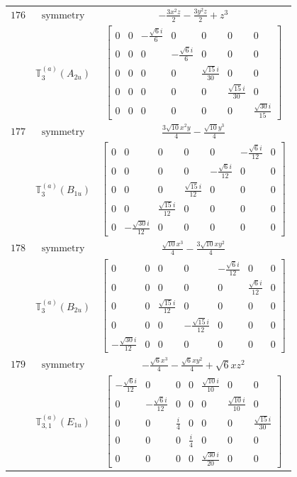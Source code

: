\documentclass[fleqn,8pt,landscape]{jsarticle}
\begin{document}
\begin{longtable}{ccc}
$ 176 $ & $ \text{symmetry} $ & $ - \frac{3 x^{2} z}{2} - \frac{3 y^{2} z}{2} + z^{3} $ \\
$  $ & $ \mathbb{T}_{3}^{(a)}(A_{2u}) $ & $ \begin{bmatrix} 0 & 0 & - \frac{\sqrt{6} i}{6} & 0 & 0 & 0 & 0 \\ 0 & 0 & 0 & - \frac{\sqrt{6} i}{6} & 0 & 0 & 0 \\ 0 & 0 & 0 & 0 & \frac{\sqrt{15} i}{30} & 0 & 0 \\ 0 & 0 & 0 & 0 & 0 & \frac{\sqrt{15} i}{30} & 0 \\ 0 & 0 & 0 & 0 & 0 & 0 & \frac{\sqrt{30} i}{15} \end{bmatrix} $ \\ \hline
$ 177 $ & $ \text{symmetry} $ & $ \frac{3 \sqrt{10} x^{2} y}{4} - \frac{\sqrt{10} y^{3}}{4} $ \\
$  $ & $ \mathbb{T}_{3}^{(a)}(B_{1u}) $ & $ \begin{bmatrix} 0 & 0 & 0 & 0 & 0 & - \frac{\sqrt{6} i}{12} & 0 \\ 0 & 0 & 0 & 0 & - \frac{\sqrt{6} i}{12} & 0 & 0 \\ 0 & 0 & 0 & \frac{\sqrt{15} i}{12} & 0 & 0 & 0 \\ 0 & 0 & \frac{\sqrt{15} i}{12} & 0 & 0 & 0 & 0 \\ 0 & - \frac{\sqrt{30} i}{12} & 0 & 0 & 0 & 0 & 0 \end{bmatrix} $ \\ \hline
$ 178 $ & $ \text{symmetry} $ & $ \frac{\sqrt{10} x^{3}}{4} - \frac{3 \sqrt{10} x y^{2}}{4} $ \\
$  $ & $ \mathbb{T}_{3}^{(a)}(B_{2u}) $ & $ \begin{bmatrix} 0 & 0 & 0 & 0 & - \frac{\sqrt{6} i}{12} & 0 & 0 \\ 0 & 0 & 0 & 0 & 0 & \frac{\sqrt{6} i}{12} & 0 \\ 0 & 0 & \frac{\sqrt{15} i}{12} & 0 & 0 & 0 & 0 \\ 0 & 0 & 0 & - \frac{\sqrt{15} i}{12} & 0 & 0 & 0 \\ - \frac{\sqrt{30} i}{12} & 0 & 0 & 0 & 0 & 0 & 0 \end{bmatrix} $ \\ \hline
$ 179 $ & $ \text{symmetry} $ & $ - \frac{\sqrt{6} x^{3}}{4} - \frac{\sqrt{6} x y^{2}}{4} + \sqrt{6} x z^{2} $ \\
$  $ & $ \mathbb{T}_{3,1}^{(a)}(E_{1u}) $ & $ \begin{bmatrix} - \frac{\sqrt{6} i}{12} & 0 & 0 & 0 & \frac{\sqrt{10} i}{10} & 0 & 0 \\ 0 & - \frac{\sqrt{6} i}{12} & 0 & 0 & 0 & \frac{\sqrt{10} i}{10} & 0 \\ 0 & 0 & \frac{i}{4} & 0 & 0 & 0 & \frac{\sqrt{15} i}{30} \\ 0 & 0 & 0 & \frac{i}{4} & 0 & 0 & 0 \\ 0 & 0 & 0 & 0 & \frac{\sqrt{30} i}{20} & 0 & 0 \end{bmatrix} $ \\ \hline

\end{longtable}
\end{document}
